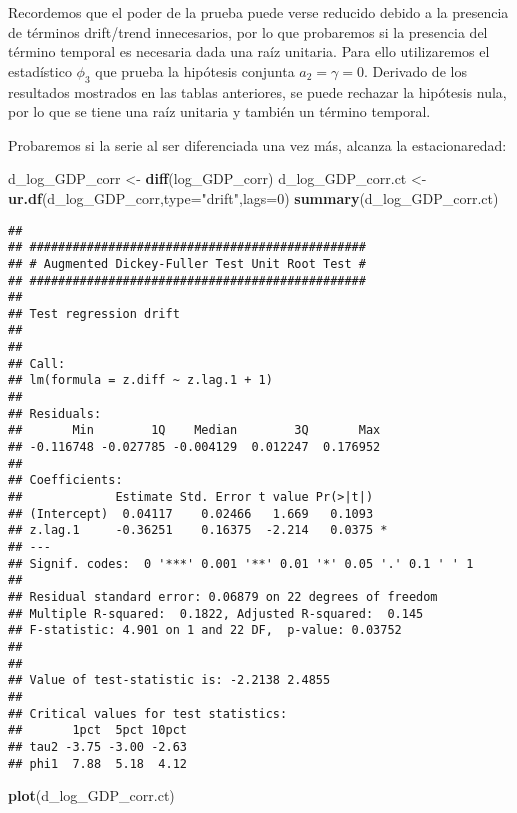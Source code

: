 \documentclass[]{book}
\newenvironment{Shaded}{\begin{snugshade}}{\end{snugshade}}
\newcommand{\KeywordTok}[1]{\textcolor[rgb]{0.13,0.29,0.53}{\textbf{#1}}}
\newcommand{\DataTypeTok}[1]{\textcolor[rgb]{0.13,0.29,0.53}{#1}}
\newcommand{\DecValTok}[1]{\textcolor[rgb]{0.00,0.00,0.81}{#1}}
\newcommand{\StringTok}[1]{\textcolor[rgb]{0.31,0.60,0.02}{#1}}
\newcommand{\NormalTok}[1]{#1}
\theoremstyle{definition}
\theoremstyle{definition}
\theoremstyle{definition}
\theoremstyle{remark}
\begin{document}
Recordemos que el poder de la prueba puede verse reducido debido a la
presencia de términos drift/trend innecesarios, por lo que probaremos si
la presencia del término temporal es necesaria dada una raíz unitaria.
Para ello utilizaremos el estadístico \(\phi_3\) que prueba la hipótesis
conjunta \(a_2=\gamma=0\). Derivado de los resultados mostrados en las
tablas anteriores, se puede rechazar la hipótesis nula, por lo que se
tiene una raíz unitaria y también un término temporal.

Probaremos si la serie al ser diferenciada una vez más, alcanza la
estacionaredad:

\begin{Shaded}
\begin{Highlighting}[]
\NormalTok{d_log_GDP_corr <-}\StringTok{ }\KeywordTok{diff}\NormalTok{(log_GDP_corr)}
\NormalTok{d_log_GDP_corr.ct <-}\StringTok{ }\KeywordTok{ur.df}\NormalTok{(d_log_GDP_corr,}\DataTypeTok{type=}\StringTok{"drift"}\NormalTok{,}\DataTypeTok{lags=}\DecValTok{0}\NormalTok{)}
\KeywordTok{summary}\NormalTok{(d_log_GDP_corr.ct)}
\end{Highlighting}
\end{Shaded}

\begin{verbatim}
## 
## ############################################### 
## # Augmented Dickey-Fuller Test Unit Root Test # 
## ############################################### 
## 
## Test regression drift 
## 
## 
## Call:
## lm(formula = z.diff ~ z.lag.1 + 1)
## 
## Residuals:
##       Min        1Q    Median        3Q       Max 
## -0.116748 -0.027785 -0.004129  0.012247  0.176952 
## 
## Coefficients:
##             Estimate Std. Error t value Pr(>|t|)  
## (Intercept)  0.04117    0.02466   1.669   0.1093  
## z.lag.1     -0.36251    0.16375  -2.214   0.0375 *
## ---
## Signif. codes:  0 '***' 0.001 '**' 0.01 '*' 0.05 '.' 0.1 ' ' 1
## 
## Residual standard error: 0.06879 on 22 degrees of freedom
## Multiple R-squared:  0.1822, Adjusted R-squared:  0.145 
## F-statistic: 4.901 on 1 and 22 DF,  p-value: 0.03752
## 
## 
## Value of test-statistic is: -2.2138 2.4855 
## 
## Critical values for test statistics: 
##       1pct  5pct 10pct
## tau2 -3.75 -3.00 -2.63
## phi1  7.88  5.18  4.12
\end{verbatim}

\begin{Shaded}
\begin{Highlighting}[]
\KeywordTok{plot}\NormalTok{(d_log_GDP_corr.ct)}
\end{Highlighting}
\end{Shaded}
\end{document}
